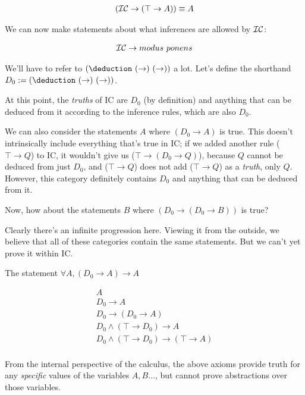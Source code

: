 \documentclass{article}
\begin{document}
  \begin{align*}
    (\operatorname{\mathcal{IC}} \to (\top \to A)) \equiv A\\
  \end{align*}
  
  We can now make statements about what inferences are allowed by $\operatorname{\mathcal{IC}}$:
  
  \begin{align*}
    \operatorname{\mathcal{IC}} \to modus\ ponens\\
  \end{align*}

  
  We'll have to refer to $(\deduction\ (\to)\ (\to))$ a lot. Let's define the shorthand $D_0 := (\deduction\ (\to)\ (\to))$.
  
  At this point, the \emph{truths} of IC are $D_0$ (by definition) and anything that can be deduced from it according to the inference rules, which are also $D_0$.
  
  We can also consider the statements $A$ where $(D_0 \to A)$ is true. This doesn't intrinsically include everything that's true in IC; if we added another rule ($\top \to Q$) to IC, it wouldn't give us ($\top \to (D_0 \to Q)$), because $Q$ cannot be deduced from just $D_0$, and ($\top \to Q$) does not add ($\top \to Q$) as a \emph{truth}, only $Q$. However, this category definitely contains $D_0$ and anything that can be deduced from it.
  
  Now, how about the statements $B$ where $(D_0 \to (D_0 \to B))$ is true?
  
  Clearly there's an infinite progression here. Viewing it from the outside, we believe that all of these categories contain the same statements. But we can't yet prove it within IC.
  
  The statement $\forall A, (D_0 \to A) \to A$
  
  \begin{align*}
    A\\
    D_0 \to A\\
    D_0 \to (D_0 \to A)\\
    D_0 \wedge (\top \to D_0) \to A\\
    D_0 \wedge (\top \to D_0) \to (\top \to A)\\
  \end{align*}




  \newcommand{\ic}[1]{#1}


  From the internal perspective of the calculus, the above axioms provide truth for any \emph{specific} values of the variables $A, B\dots$, but cannot prove abstractions over those variables.
\end{document}
